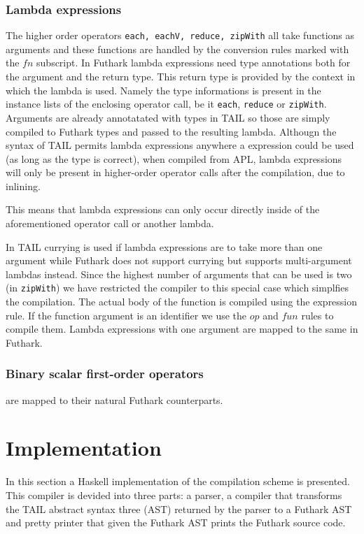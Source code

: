 \documentclass[11pt]{article}
\begin{document}
\subsubsection{Lambda expressions} 
The higher order operators {\tt each, eachV, reduce, zipWith} all take functions as arguments and these functions are handled by the
conversion rules marked with the $fn$ subscript. 
In Futhark lambda expressions need type annotations both for the argument and the return type.
This return type is provided by the context in which the lambda is used.
Namely the type informations is present in the instance lists of the enclosing operator call, be it {\tt each}, {\tt reduce} or {\tt zipWith}.
Arguments are already annotatated with types in TAIL so those are simply compiled to Futhark types and passed to the resulting lambda. Althougn the syntax of TAIL permits lambda expressions anywhere a  expression could be used (as long as the type is correct),
when compiled from APL, lambda expressions will only be present in higher-order operator calls after the compilation, due to inlining.

This means that lambda expressions can only occur directly inside of the aforementioned operator call or another lambda.

In TAIL currying is used if lambda expressions are to take more than one argument while Futhark does not support currying but
supports multi-argument lambdas instead.
Since the highest number of arguments that can be used is two (in {\tt zipWith}) we have
restricted the compiler to this special case which simplfies the compilation.
The actual body of the function is compiled using the expression rule.
If the function argument is an identifier we use the $op$ and $fun$ rules to compile them.
Lambda expressions with one argument are mapped to the same in Futhark.


\subsubsection{Binary scalar first-order operators} are mapped to their natural Futhark counterparts.

\section{Implementation}
\label{sec:impl}
In this section a Haskell implementation of the compilation scheme is presented. This compiler is devided into three parts: a parser, a compiler that transforms the TAIL abstract syntax three (AST) returned by the parser to a Futhark AST and pretty printer that given the Futhark AST prints the Futhark source code. 
\end{document}

